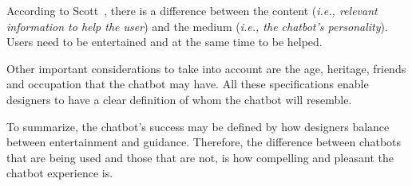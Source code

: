 \documentclass[a4paper,10pt]{article}
\begin{document}
According to Scott~\cite{HeuristicsWebPage}, there is a difference between the content (\textit{i.e., relevant information to help the user}) and the medium (\textit{i.e., the chatbot’s personality}). Users need to be entertained and at the same time to be helped.      


Other important considerations to take into account are the age, heritage, friends and occupation that the chatbot may have. All these specifications enable designers to have a clear definition of whom the chatbot will resemble.

To summarize, the chatbot’s success may be defined by how designers balance between entertainment and guidance. Therefore, the difference between chatbots that are being used and those that are not, is how compelling and pleasant the chatbot experience is.


\end{document}
